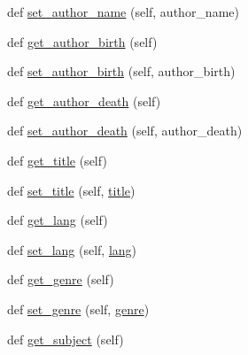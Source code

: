 \begin{DoxyCompactItemize}
def \mbox{\hyperlink{classbridges_1_1data__src__dependent_1_1book_1_1_book_ab0454e4b5dd431cd4f9fe6e877de38bb}{set\+\_\+author\+\_\+name}} (self, author\+\_\+name)
\item 
def \mbox{\hyperlink{classbridges_1_1data__src__dependent_1_1book_1_1_book_a2300650495462b37ac535218712a9daa}{get\+\_\+author\+\_\+birth}} (self)
\item 
def \mbox{\hyperlink{classbridges_1_1data__src__dependent_1_1book_1_1_book_ac6accc4ce5e41670106639011a07fe97}{set\+\_\+author\+\_\+birth}} (self, author\+\_\+birth)
\item 
def \mbox{\hyperlink{classbridges_1_1data__src__dependent_1_1book_1_1_book_af435916a9893a1705fb4dc4c654447d5}{get\+\_\+author\+\_\+death}} (self)
\item 
def \mbox{\hyperlink{classbridges_1_1data__src__dependent_1_1book_1_1_book_a25fcfd17d5cb0ad01cb8b60461c4bb62}{set\+\_\+author\+\_\+death}} (self, author\+\_\+death)
\item 
def \mbox{\hyperlink{classbridges_1_1data__src__dependent_1_1book_1_1_book_a6f0b334b75c5971738fd0fe26872e381}{get\+\_\+title}} (self)
\item 
def \mbox{\hyperlink{classbridges_1_1data__src__dependent_1_1book_1_1_book_a5cd5a26ef4f1d81be0c67f2714e277be}{set\+\_\+title}} (self, \mbox{\hyperlink{classbridges_1_1data__src__dependent_1_1book_1_1_book_a3f3a5222313c5550fba6f78d9c94dd40}{title}})
\item 
def \mbox{\hyperlink{classbridges_1_1data__src__dependent_1_1book_1_1_book_ab67944a2cce97cc0bf00296f15b064cb}{get\+\_\+lang}} (self)
\item 
def \mbox{\hyperlink{classbridges_1_1data__src__dependent_1_1book_1_1_book_a91e19e3636d6bf51de2668d7df1710e4}{set\+\_\+lang}} (self, \mbox{\hyperlink{classbridges_1_1data__src__dependent_1_1book_1_1_book_a151964bd1255904b4da128ced2258938}{lang}})
\item 
def \mbox{\hyperlink{classbridges_1_1data__src__dependent_1_1book_1_1_book_a38bb0f38ee4c22c6d30826d537d68a5c}{get\+\_\+genre}} (self)
\item 
def \mbox{\hyperlink{classbridges_1_1data__src__dependent_1_1book_1_1_book_ad3b36ec8265877c6c282c67dae69d804}{set\+\_\+genre}} (self, \mbox{\hyperlink{classbridges_1_1data__src__dependent_1_1book_1_1_book_ab370cb529de13f728326dc1e9dd9224d}{genre}})
\item 
def \mbox{\hyperlink{classbridges_1_1data__src__dependent_1_1book_1_1_book_a8d410f0170cda3a98d54a28817260d7d}{get\+\_\+subject}} (self)
\item 

\end{DoxyCompactItemize}
